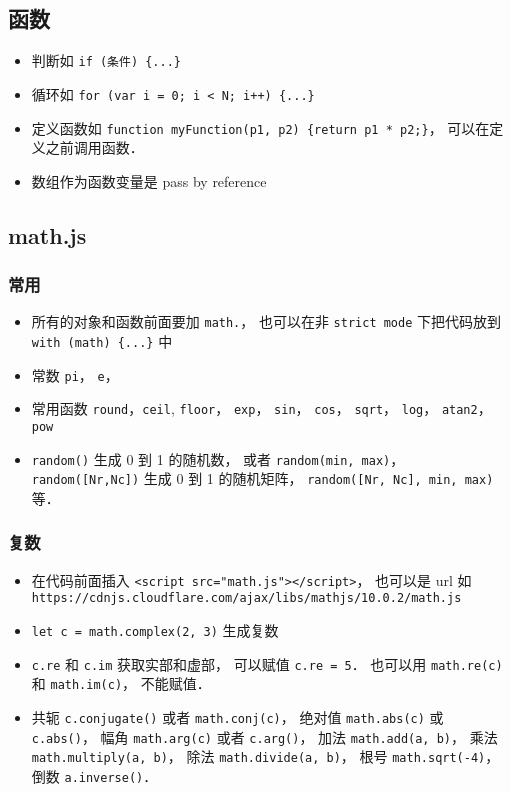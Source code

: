 \subsection{函数}
\begin{itemize}
\item 判断如 \verb|if (条件) {...}|
\item 循环如 \verb|for (var i = 0; i < N; i++) {...}|
\item 定义函数如 \verb|function myFunction(p1, p2) {return p1 * p2;}|， 可以在定义之前调用函数．
\item 数组作为函数变量是 pass by reference
\end{itemize}

\subsection{math.js}
\subsubsection{常用}
\begin{itemize}
\item 所有的对象和函数前面要加 \verb|math.|， 也可以在非 \verb|strict mode| 下把代码放到 \verb|with (math) {...}| 中
\item 常数 \verb|pi|， \verb|e|， 
\item 常用函数 \verb|round|，\verb|ceil|, \verb|floor|， \verb|exp|， \verb|sin|， \verb|cos|， \verb|sqrt|， \verb|log|， \verb|atan2|， \verb|pow|
\item \verb|random()| 生成 0 到 1 的随机数， 或者 \verb|random(min, max)|， \verb|random([Nr,Nc])| 生成 0 到 1 的随机矩阵， \verb|random([Nr, Nc], min, max)| 等．
\end{itemize}

\subsubsection{复数}
\begin{itemize}
\item 在代码前面插入 \verb|<script src="math.js"></script>|， 也可以是 url 如 \verb|https://cdnjs.cloudflare.com/ajax/libs/mathjs/10.0.2/math.js|
\item \verb|let c = math.complex(2, 3)| 生成复数
\item \verb|c.re| 和 \verb|c.im| 获取实部和虚部， 可以赋值 \verb|c.re = 5|． 也可以用 \verb|math.re(c)| 和 \verb|math.im(c)|， 不能赋值．
\item 共轭 \verb|c.conjugate()| 或者 \verb|math.conj(c)|， 绝对值 \verb|math.abs(c)| 或 \verb|c.abs()|， 幅角 \verb|math.arg(c)| 或者 \verb|c.arg()|， 加法 \verb|math.add(a, b)|， 乘法 \verb|math.multiply(a, b)|， 除法 \verb|math.divide(a, b)|， 根号 \verb|math.sqrt(-4)|， 倒数 \verb|a.inverse()|．
\end{itemize}

